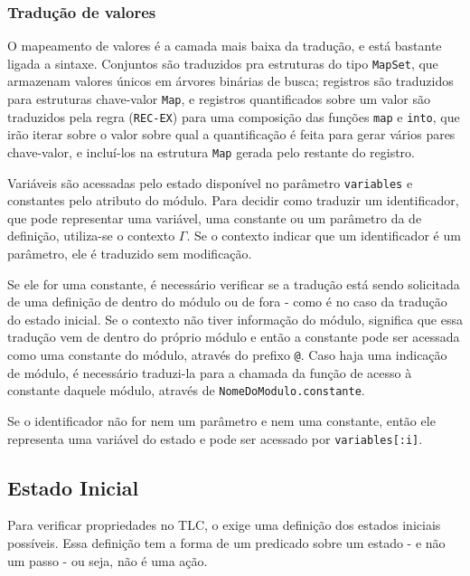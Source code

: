 \subsubsection{Tradução de valores}



O mapeamento de valores é a camada mais baixa da tradução, e está bastante
ligada a sintaxe. Conjuntos são traduzidos pra estruturas do tipo
\texttt{MapSet}, que armazenam valores únicos em árvores binárias de busca;
registros são traduzidos para estruturas chave-valor \texttt{Map}, e registros
quantificados sobre um valor são traduzidos pela regra (\texttt{REC-EX}) para
uma composição das funções \texttt{map} e \texttt{into}, que irão iterar sobre o
valor sobre qual a quantificação é feita para gerar vários pares chave-valor, e
incluí-los na estrutura \texttt{Map} gerada pelo restante do registro.

Variáveis são acessadas pelo estado disponível no parâmetro \texttt{variables} e
constantes pelo atributo do módulo. Para decidir como traduzir um identificador,
que pode representar uma variável,
uma constante ou um parâmetro da de definição, utiliza-se o contexto $\Gamma$.
Se o contexto indicar que um identificador é um parâmetro, ele é traduzido sem
modificação.

Se ele for uma constante, é necessário verificar se a tradução está
sendo solicitada de uma definição de dentro do módulo ou de fora - como é no
caso da tradução do estado inicial. Se o contexto não tiver informação do
módulo, significa que essa tradução vem de dentro do próprio módulo e então a
constante pode ser acessada como uma constante do módulo, através do prefixo
\texttt{@}. Caso haja uma indicação de módulo, é necessário traduzi-la para a
chamada da função de acesso à constante daquele módulo, através de
\texttt{NomeDoModulo.constante}.

Se o identificador não for nem um parâmetro e nem uma constante, então ele
representa uma variável do estado e pode ser acessado por \texttt{variables[:i]}.

\subsection{Estado Inicial}

Para verificar propriedades no TLC, o \TLA exige uma definição dos estados
iniciais possíveis. Essa definição tem a forma de um predicado sobre um estado
- e não um passo - ou seja, não é uma ação.

